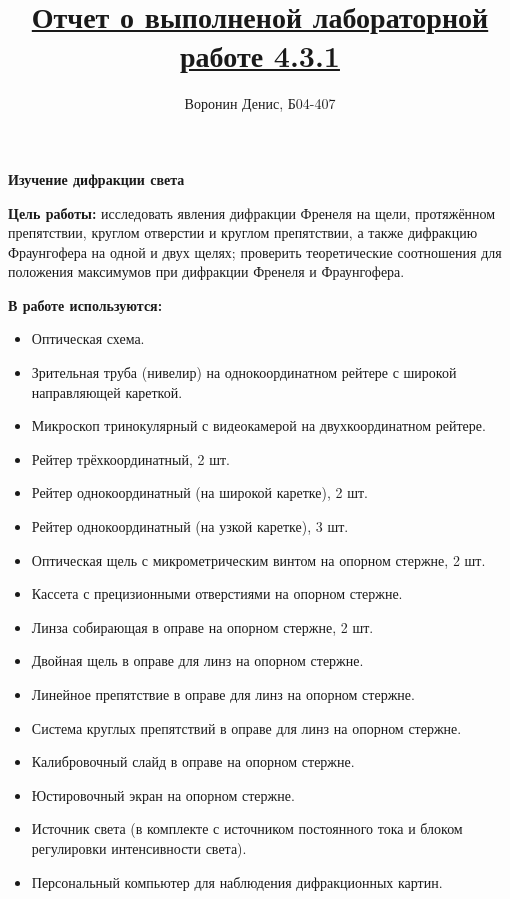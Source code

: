 \documentclass[a4paper]{article}
\title{\underline{Отчет о выполненой лабораторной работе 4.3.1}}
\author{Воронин Денис, Б04-407}
\begin{document}
\maketitle

\begin{center}
\textbf{\Large Изучение дифракции света}
\end{center}

\textbf{Цель работы:} исследовать явления дифракции Френеля на щели, протяжённом 
препятствии, круглом отверстии и круглом препятствии, а также дифракцию 
Фраунгофера на одной и двух щелях; проверить теоретические соотношения для 
положения максимумов при дифракции Френеля и Фраунгофера.

\textbf{В работе используются:}

\begin{itemize}
    \item Оптическая схема.
    \item Зрительная труба (нивелир) на однокоординатном рейтере с широкой направляющей кареткой.
    \item Микроскоп тринокулярный с видеокамерой на двухкоординатном рейтере.
    \item Рейтер трёхкоординатный, 2 шт.
    \item Рейтер однокоординатный (на широкой каретке), 2 шт.
    \item Рейтер однокоординатный (на узкой каретке), 3 шт.
    \item Оптическая щель с микрометрическим винтом на опорном стержне, 2 шт.
    \item Кассета с прецизионными отверстиями на опорном стержне.
    \item Линза собирающая в оправе на опорном стержне, 2 шт.
    \item Двойная щель в оправе для линз на опорном стержне.
    \item Линейное препятствие в оправе для линз на опорном стержне.
    \item Система круглых препятствий в оправе для линз на опорном стержне.
    \item Калибровочный слайд в оправе на опорном стержне.
    \item Юстировочный экран на опорном стержне.
    \item Источник света (в комплекте с источником постоянного тока и блоком регулировки интенсивности света).
    \item Персональный компьютер для наблюдения дифракционных картин.
\end{itemize}
\end{document}
